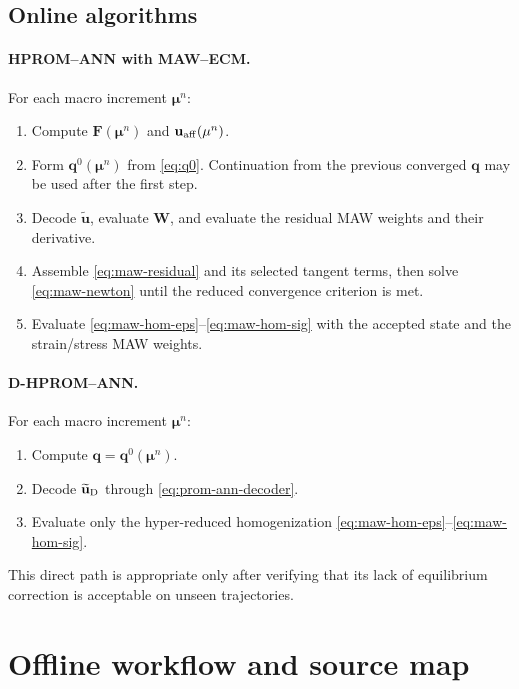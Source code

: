 \documentclass[11pt,a4paper]{article}
\newcommand{\vect}[1]{\mathbf{#1}}
\newcommand{\mat}[1]{\mathbf{#1}}
\begin{document}
\subsection{Online algorithms}

\paragraph{HPROM--ANN with MAW--ECM.}
For each macro increment \(\vect\mu^n\):
\begin{enumerate}[label=\arabic*.,leftmargin=8mm]
  \item Compute \(\mat F(\vect\mu^n)\) and
  \(\vect u_{\rm aff}(\vect\mu^n)\).
  \item Form \(\vect q^0(\vect\mu^n)\) from \cref{eq:q0}.  Continuation
  from the previous converged \(\vect q\) may be used after the first step.
  \item Decode \(\widetilde{\vect u}\), evaluate \(\mat W\), and evaluate
  the residual MAW weights and their derivative.
  \item Assemble \cref{eq:maw-residual} and its selected tangent terms, then
  solve \cref{eq:maw-newton} until the reduced convergence criterion is met.
  \item Evaluate \cref{eq:maw-hom-eps}--\cref{eq:maw-hom-sig} with the
  accepted state and the strain/stress MAW weights.
\end{enumerate}

\paragraph{D-HPROM--ANN.}
For each macro increment \(\vect\mu^n\):
\begin{enumerate}[label=\arabic*.,leftmargin=8mm]
  \item Compute \(\vect q=\vect q^0(\vect\mu^n)\).
  \item Decode \(\widetilde{\vect u}_{\rm D}\) through
  \cref{eq:prom-ann-decoder}.
  \item Evaluate only the hyper-reduced homogenization
  \cref{eq:maw-hom-eps}--\cref{eq:maw-hom-sig}.
\end{enumerate}
This direct path is appropriate only after verifying that its lack of
equilibrium correction is acceptable on unseen trajectories.

\section{Offline workflow and source map}
\label{sec:source-map}
\end{document}
